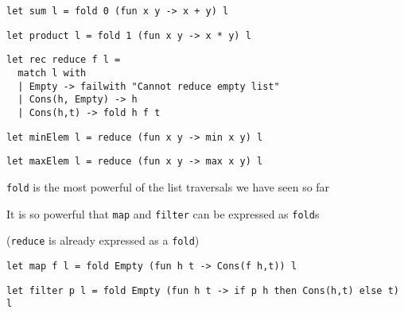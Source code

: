 \documentclass{beamer}
\begin{document}
\begin{frame}[fragile]
\begin{lstlisting}
let sum l = fold 0 (fun x y -> x + y) l
\end{lstlisting}
\end{frame}

\begin{frame}[fragile]
\begin{lstlisting}
let product l = fold 1 (fun x y -> x * y) l
\end{lstlisting}
\end{frame}

\begin{frame}[fragile]
\begin{lstlisting}
let rec reduce f l = 
  match l with
  | Empty -> failwith "Cannot reduce empty list"
  | Cons(h, Empty) -> h
  | Cons(h,t) -> fold h f t
\end{lstlisting}
\end{frame}

\begin{frame}[fragile]
\begin{lstlisting}
let minElem l = reduce (fun x y -> min x y) l
\end{lstlisting}
\end{frame}

\begin{frame}[fragile]
\begin{lstlisting}
let maxElem l = reduce (fun x y -> max x y) l
\end{lstlisting}
\end{frame}

\begin{slide}{
\item \texttt{fold} is the most powerful of the list traversals we have seen so far
\item It is so powerful that \texttt{map} and \texttt{filter} can be expressed as \texttt{fold}s
\item (\texttt{reduce} is already expressed as a \texttt{fold})
}\end{slide}

\begin{frame}[fragile]
\begin{lstlisting}
let map f l = fold Empty (fun h t -> Cons(f h,t)) l
\end{lstlisting}
\end{frame}

\begin{frame}[fragile]
\begin{lstlisting}
let filter p l = fold Empty (fun h t -> if p h then Cons(h,t) else t) l
\end{lstlisting}
\end{frame}
\end{document}
